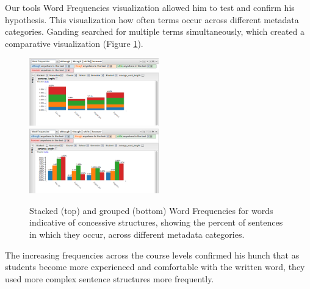\documentclass{sig-alternate}
\begin{document}
Our tools Word Frequencies visualization allowed him to test and confirm his hypothesis. This visualization how often terms occur across different metadata categories. Ganding searched for multiple terms simultaneously, which created a comparative visualization (Figure \ref{fig:rex05}).

\begin{figure}[h!]
\includegraphics[width=0.5\textwidth]{fig/rex/05.png}
\includegraphics[width=0.5\textwidth]{fig/rex/05b.png}
\caption{Stacked (top) and grouped (bottom) Word Frequencies for words indicative of concessive structures, showing the percent of sentences in which they occur, across different metadata categories. \label{fig:rex05}}
\end{figure}

The increasing frequencies across the course levels confirmed his hunch that as students become more experienced and comfortable with the written word, they used more complex sentence structures more frequently. 
\end{document}
